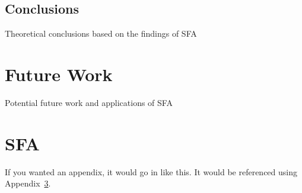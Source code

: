 \documentclass[12pt, oneside]{smuthesis}
\begin{document}
\section{\sc Conclusions}

Theoretical conclusions based on the findings of SFA

\chapter{\sc Future Work}

Potential future work and applications of SFA


\appendix

\chapter{SFA}
\label{app:sfa}
If you wanted an appendix, it would go in like this.  It would be 
referenced using Appendix~\ref{app:sfa}.


\begin{singlespace}

\end{singlespace}
\end{document}
